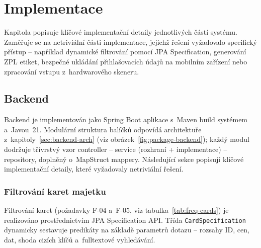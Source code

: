 \chapter{Implementace}\label{chap:implementation}

\begin{chapterabstract}
	Kapitola popisuje klíčové implementační detaily jednotlivých částí systému. Zaměřuje se na netriviální části implementace, jejichž řešení vyžadovalo specifický přístup -- například dynamické filtrování pomocí JPA Specification, generování ZPL etiket, bezpečné ukládání přihlašovacích údajů na mobilním zařízení nebo zpracování vstupu z~hardwarového skeneru.
\end{chapterabstract}

\section{Backend}

Backend je implementován jako Spring Boot aplikace s~Maven build systémem a~Javou~21. Modulární struktura balíčků odpovídá architektuře z~kapitoly~\ref{sec:backend-arch} (viz obrázek~\ref{fig:package-backend}); každý modul dodržuje třívrstvý vzor controller -- service (rozhraní + implementace) -- repository, doplněný o~MapStruct mappery. Následující sekce popisují klíčové implementační detaily, které vyžadovaly netriviální řešení.

\subsection{Filtrování karet majetku}

Filtrování karet (požadavky F-04 a~F-05, viz tabulka~\ref{tab:freq-cards}) je realizováno prostřednictvím JPA Specification API. Třída \texttt{CardSpecification} dynamicky sestavuje predikáty na základě parametrů dotazu -- rozsahy ID, cen, dat, shoda cizích klíčů a~fulltextové vyhledávání.

